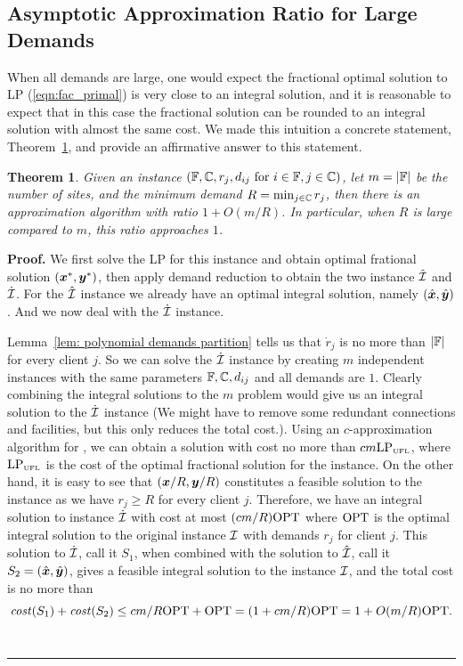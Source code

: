 \documentclass[oneside,final]{ucr}
\newtheorem{theorem}{Theorem}
\newenvironment{proof}[1][Proof]{\textbf{#1.} }{\ \rule{0.5em}{0.5em}}
\begin{document}
\subsection{Asymptotic Approximation Ratio for Large
  Demands}
When all demands are large, one would expect the fractional
optimal solution to LP (\ref{eqn:fac_primal}) is very close
to an integral solution, and it is reasonable to expect that
in this case the fractional solution can be rounded to an
integral solution with almost the same cost. We made this
intuition a concrete statement, Theorem~\ref{thm:largeR},
and provide an affirmative answer to this statement.

\begin{theorem}
  \label{thm:largeR}
  Given an {\FTFP} instance $(\mathbb{F}, \mathbb{C}, r_j,
  d_{ij} \text{ for } i\in\mathbb{F}, j\in\mathbb{C})$, let
  $m = |\mathbb{F}|$ be the number of sites, and the minimum
  demand $R = \min_{j\in\mathbb{C}} r_j$, then there is an
  approximation algorithm with ratio $1 + O(m/R)$. In
  particular, when $R$ is large compared to $m$, this ratio
  approaches $1$.
\end{theorem}

\begin{proof}
  We first solve the LP for this instance and obtain optimal
  frational solution $(\boldsymbol{x}^\ast, \boldsymbol{y}^\ast)$, then apply
  demand reduction to obtain the two instance $\hat {\mathcal{I}}$
  and $\dot {\mathcal{I}}$. For the $\hat {\mathcal{I}}$ instance we already
  have an optimal integral solution, namely
  $(\hat{\boldsymbol{x}},\hat{\boldsymbol{y}})$. And we now deal with the
  $\dot{\mathcal{I}}$ instance.

  Lemma~\ref{lem: polynomial demands partition} tells us
  that $\dot r_j$ is no more than $|\mathbb{F}|$ for every
  client $j$. So we can solve the $\dot {\mathcal{I}}$ instance by
  creating $m$ independent {\UFL} instances with the same
  parameters $\mathbb{F}, \mathbb{C}, d_{ij}$ and all demands
  are $1$. Clearly combining the integral solutions to the
  $m$ {\UFL} problem would give us an integral solution to
  the $\dot {\mathcal{I}}$ instance (We might have to remove some
  redundant connections and facilities, but this only
  reduces the total cost.). Using an $c$-approximation
  algorithm for {\UFL}, we can obtain a solution with cost
  no more than $cm \mbox{\rm LP}_{\mbox{\tiny\rm UFL}}$, where $\mbox{\rm LP}_{\mbox{\tiny\rm UFL}}$
  is the cost of the optimal fractional solution for the
  {\UFL} instance. On the other hand, it is easy to see that
  $(\boldsymbol{x}/R,\boldsymbol{y}/R)$ constitutes a feasible solution to the
  {\UFL} instance as we have $r_j \geq R$ for every client
  $j$. Therefore, we have an integral solution to instance
  $\dot{\mathcal{I}}$ with cost at most $(cm/R) \mbox{\rm OPT}$ where $\mbox{\rm OPT}$ is
  the optimal integral solution to the original {\FTFP}
  instance $\mathcal{I}$ with demands $r_j$ for client $j$. This
  solution to $\dot{\mathcal{I}}$, call it $S_1$, when combined with
  the solution to $\hat{\mathcal{I}}$, call it $S_2 =
  (\hat{\boldsymbol{x}},\hat{\boldsymbol{y}})$, gives a feasible integral solution
  to the instance $\mathcal{I}$, and the total cost is no more
  than
  \begin{equation*}
    {\it cost}(S_1) + {\it cost}(S_2) \leq cm/R \mbox{\rm OPT} + \mbox{\rm OPT} = (1 +
    cm/R) \mbox{\rm OPT} = 1 + O(m/R) \mbox{\rm OPT}.
  \end{equation*}
\end{proof}
\end{document}
